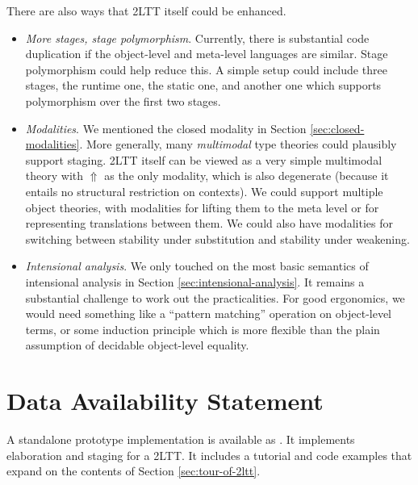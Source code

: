 \documentclass[acmsmall,screen]{acmart}
\newcommand{\Lift}{{\Uparrow}}
\theoremstyle{remark}
\begin{document}
There are also ways that 2LTT itself could be enhanced.
\begin{itemize}
\item \emph{More stages, stage polymorphism}. Currently, there is substantial
  code duplication if the object-level and meta-level languages are similar.
  Stage polymorphism could help reduce this. A simple setup could include three
  stages, the runtime one, the static one, and another one which supports
  polymorphism over the first two stages.
\item \emph{Modalities}. We mentioned the closed modality in Section
  \ref{sec:closed-modalities}.  More generally, many \emph{multimodal}
  \cite{gratzer20multimodal} type theories could plausibly support staging. 2LTT
  itself can be viewed as a very simple multimodal theory with $\Lift$ as the
  only modality, which is also degenerate (because it entails no structural
  restriction on contexts). We could support multiple object theories, with
  modalities for lifting them to the meta level or for representing translations
  between them. We could also have modalities for switching between stability
  under substitution and stability under weakening.
\item \emph{Intensional analysis}. We only touched on the most basic semantics
  of intensional analysis in Section \ref{sec:intensional-analysis}. It remains
  a substantial challenge to work out the practicalities. For good ergonomics,
  we would need something like a ``pattern matching'' operation on object-level
  terms, or some induction principle which is more flexible than the plain
  assumption of decidable object-level equality.
\end{itemize}

\section{Data Availability Statement}

A standalone prototype implementation is available as \cite{staged-demo}. It
implements elaboration and staging for a 2LTT. It includes a tutorial and code
examples that expand on the contents of Section \ref{sec:tour-of-2ltt}.


\end{document}
